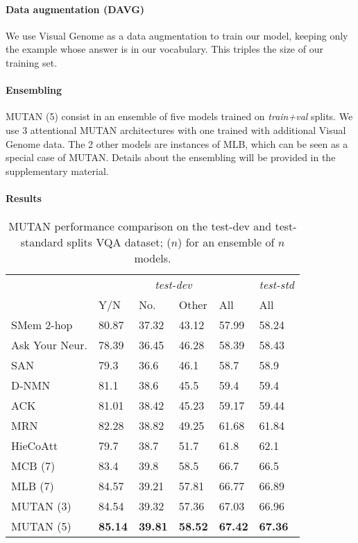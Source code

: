 \documentclass[10pt,twocolumn,letterpaper]{article}
\begin{document}
\paragraph{Data augmentation (DAVG)}
We use Visual Genome \cite{krishnavisualgenome} as a data augmentation to train our model, keeping only the example whose answer is in our vocabulary. This triples the size of our training set.
\vspace{-0.4cm}
\paragraph{Ensembling}
MUTAN (5) consist in an ensemble of five models trained on \emph{train+val} splits. We use 3 attentional MUTAN architectures with one trained with additional Visual Genome data. The 2 other models are instances of MLB, which can be seen as a special case of MUTAN. Details about the ensembling will be provided in the supplementary material.
 \vspace{-0.4cm}
\paragraph{Results}

\begin{table}
\begin{tabularx}{\columnwidth}{l*{4}{X}X}
\toprule
& \multicolumn{4}{c}{\textit{test-dev}} & \textit{test-std} \\
& Y/N & No. & Other & All & All\\
\hline
SMem 2-hop \cite{XuS16} & 80.87 & 37.32 & 43.12 & 57.99 & 58.24\\
Ask Your Neur. \cite{malinowski16ijcv} & 78.39 & 36.45 & 46.28 & 58.39 & 58.43\\
SAN \cite{YangHGDS16} & 79.3 & 36.6 & 46.1 & 58.7 & 58.9 \\
D-NMN \cite{AndreasRDK16} & 81.1 & 38.6 & 45.5 & 59.4 & 59.4 \\
ACK \cite{CVPR16AMA} & 81.01 & 38.42 & 45.23 & 59.17 & 59.44 \\
MRN \cite{kim2016b} & 82.28 & 38.82 & 49.25 & 61.68 & 61.84\\
HieCoAtt \cite{LuYBP16} & 79.7 & 38.7 & 51.7 & 61.8 & 62.1 \\
MCB (7) \cite{fukui16mcb} & 83.4 & 39.8 & 58.5 & 66.7 & 66.5 \\
MLB (7) \cite{Kim2017} & 84.57 & 39.21 & 57.81 & 66.77 & 66.89 \\
MUTAN (3) & 84.54 & 39.32 & 57.36 & 67.03 & 66.96 \\
MUTAN (5) & \textbf{85.14} & \textbf{39.81} & \textbf{58.52} & \textbf{67.42} & \textbf{67.36} \\
\bottomrule
\end{tabularx}
\caption{\label{sota} MUTAN performance comparison  on the test-dev and test-standard splits VQA dataset; ($n$) for an ensemble of $n$ models.}
\end{table}
\end{document}
